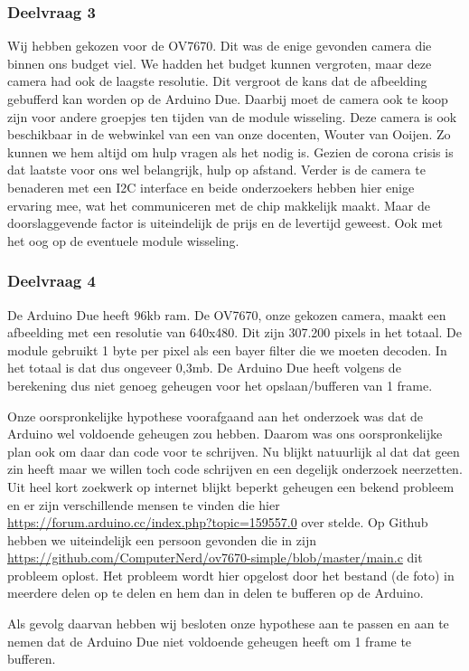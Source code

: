 \documentclass{article}
\begin{document}
\subsubsection{Deelvraag 3}
Wij hebben gekozen voor de OV7670. Dit was de enige gevonden camera die binnen ons budget viel. We hadden het budget kunnen vergroten, maar deze camera had ook de laagste resolutie. Dit vergroot de kans dat de afbeelding gebufferd kan worden op de Arduino Due. Daarbij moet de camera ook te koop zijn voor andere groepjes ten tijden van de module wisseling.  Deze camera is ook beschikbaar in de webwinkel van een van onze docenten, Wouter van Ooijen. Zo kunnen we hem altijd om hulp vragen als het nodig is. Gezien de corona crisis is dat laatste voor ons wel belangrijk, hulp op afstand. Verder is de camera te benaderen met een I2C interface en beide onderzoekers hebben hier enige ervaring mee, wat het communiceren met de chip makkelijk maakt. Maar de doorslaggevende factor is uiteindelijk de prijs en de levertijd geweest. Ook met het oog op de eventuele module wisseling.

\subsubsection{Deelvraag 4}
De Arduino Due heeft 96kb ram. De OV7670, onze gekozen camera, maakt een afbeelding met een resolutie van 640x480. Dit zijn 307.200 pixels in het totaal. De module gebruikt 1 byte per pixel als een bayer filter die we moeten decoden. In het totaal is dat dus ongeveer 0,3mb. De Arduino Due heeft volgens de berekening dus niet genoeg geheugen voor het opslaan/bufferen van 1 frame.

Onze oorspronkelijke hypothese voorafgaand aan het onderzoek was dat de Arduino wel voldoende geheugen zou hebben. Daarom was ons oorspronkelijke plan ook om daar dan code voor te schrijven. Nu blijkt natuurlijk al dat dat geen zin heeft maar we willen toch code schrijven en een degelijk onderzoek neerzetten.
Uit heel kort zoekwerk op internet blijkt beperkt geheugen een bekend probleem en er zijn verschillende mensen te vinden die hier \href{vragen}{https://forum.arduino.cc/index.php?topic=159557.0} over stelde. Op Github hebben we uiteindelijk een persoon gevonden die in zijn \href{main}{https://github.com/ComputerNerd/ov7670-simple/blob/master/main.c} dit probleem oplost. Het probleem wordt hier opgelost door het bestand (de foto) in meerdere delen op te delen en hem dan in delen te bufferen op de Arduino.

Als gevolg daarvan hebben wij besloten onze hypothese aan te passen en aan te nemen dat de Arduino Due niet voldoende geheugen heeft om 1 frame te bufferen.
\end{document}
